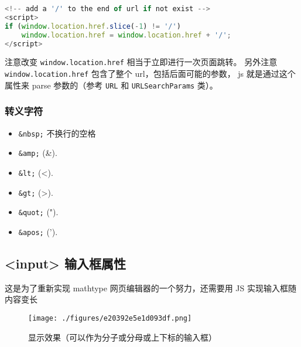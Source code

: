 \begin{itemize}
\begin{lstlisting}[language=js]
<!-- add a '/' to the end of url if not exist -->
<script>
if (window.location.href.slice(-1) != '/')
    window.location.href = window.location.href + '/';
</script>
\end{lstlisting}
注意改变 \verb`window.location.href` 相当于立即进行一次页面跳转。 另外注意 \verb`window.location.href` 包含了整个 url，包括后面可能的参数， js 就是通过这个属性来 parse 参数的（参考 \verb`URL` 和 \verb`URLSearchParams` 类）。
\end{itemize}

\subsubsection{转义字符}
\begin{itemize}
\item \verb`&nbsp;` 不换行的空格
\item \verb`&amp;` (&).
\item \verb`&lt;` (<).
\item \verb`&gt;` (>).
\item \verb`&quot;` (").
\item \verb`&apos;` (').
\end{itemize}

\subsection{<input> 输入框属性}
这是为了重新实现 mathtype 网页编辑器的一个努力，还需要用 JS 实现输入框随内容变长

\begin{figure}[ht]
\centering
\texttt{[image: ./figures/e20392e5e1d093df.png]}
\caption{显示效果（可以作为分子或分母或上下标的输入框）} \label{fig_html_1}
\end{figure}

